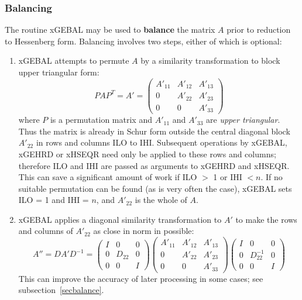 \subsubsection{Balancing}

The routine xGEBAL
may be used to {\bf balance} the
matrix $A$ prior to reduction to Hessenberg form. Balancing involves two
steps, either of which is optional:

\begin{enumerate}

\item xGEBAL
attempts to permute $A$ by a similarity transformation to
block upper triangular form:
\[
P A P^T = A'
 = \left( \begin{array}{ccc} A'_{11} & A'_{12} & A'_{13} \\
                              0    &  A'_{22} & A'_{23} \\
                              0   &   0     & A'_{33} \end{array} \right)
\]
where $P$ is a permutation matrix and $A'_{11}$ and $A'_{33}$ are
{\em upper triangular}.
Thus the matrix is already in Schur form outside the
central diagonal block $A'_{22}$ in rows and columns ILO to IHI.
Subsequent operations by xGEBAL, xGEHRD or xHSEQR need only be applied to
these rows and columns; therefore ILO and IHI are passed as arguments to
xGEHRD and
xHSEQR. This can save a significant amount of
work if ILO $>$ 1 or IHI $< n$.
If no suitable permutation can be found (as is very often the case),
xGEBAL sets ILO = 1 and IHI = $n$, and $A'_{22}$ is
the whole of $A$.

\item xGEBAL 
applies a diagonal similarity transformation to $A'$
to make the rows and columns of $A'_{22}$
as close in norm in possible:
\[
A'' = D A' D^{-1} = \left( \begin{array}{ccc} I & 0 & 0 \\
                                        0 & D_{22} & 0 \\
                                        0 & 0 & I \end{array} \right)
              \left( \begin{array}{ccc} A'_{11} & A'_{12} & A'_{13} \\
                                        0    &  A'_{22} & A'_{23} \\
                                        0   &   0  & A'_{33} \end{array} \right)
              \left( \begin{array}{ccc} I & 0 & 0 \\
                                        0 & D_{22}^{-1} & 0 \\
                                        0 & 0 & I \end{array} \right)
\]
This can improve the
accuracy of later processing in some cases; see subsection~\ref{secbalance}.


\end{enumerate}
